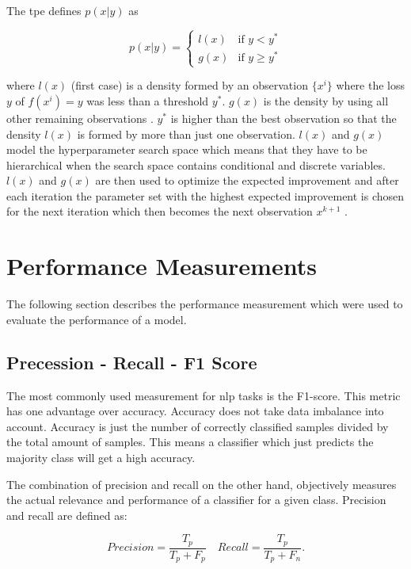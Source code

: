The \gls{tpe} defines $p(x|y)$ as 

\begin{equation}
p(x|y) =
\begin{cases}

l(x) & \text{if } y < y^* \\
g(x) & \text{if } y \geq y^*

\end{cases}
\end{equation}

where $l(x)$ {(first case)} is a density formed by an observation $\{x^i\}$ where the loss $y$ of $f(x^i)=y$ was less than a threshold $y^*$. $g(x)$ is the density by using all other remaining observations \cite{Bergstra2013a}. $y^*$ is higher than the best observation so that the density $l(x)$ is formed by more than just one observation. $l(x)$ and $g(x)$ model the hyperparameter search space which means that they have to be hierarchical when the search space contains conditional and discrete variables. $l(x)$ and $g(x)$ are then used to optimize the expected improvement and after each iteration the parameter set with the highest expected improvement is chosen for the next iteration which then becomes the next observation $x^{k+1}$ \cite{Bergstra2013a}. 

\section{Performance Measurements}
The following section describes the performance measurement which were used to evaluate the performance of a model.


\subsection{Precession - Recall - F1 Score}
The most commonly used measurement for \gls{nlp} tasks is the F1-score. This metric has one advantage over accuracy. Accuracy does not take data imbalance into account. Accuracy is just the number of correctly classified samples divided by the total amount of samples. This means a classifier which just predicts the majority class will get a high accuracy.
\medskip

The combination of precision and recall on the other hand, objectively measures the actual relevance and performance of a classifier for a given class. Precision and recall are defined as:

\begin{equation}
Precision = \frac{T_p}{T_p+F_p} \quad Recall = \frac{T_p}{T_p+F_n}.
\end{equation}

